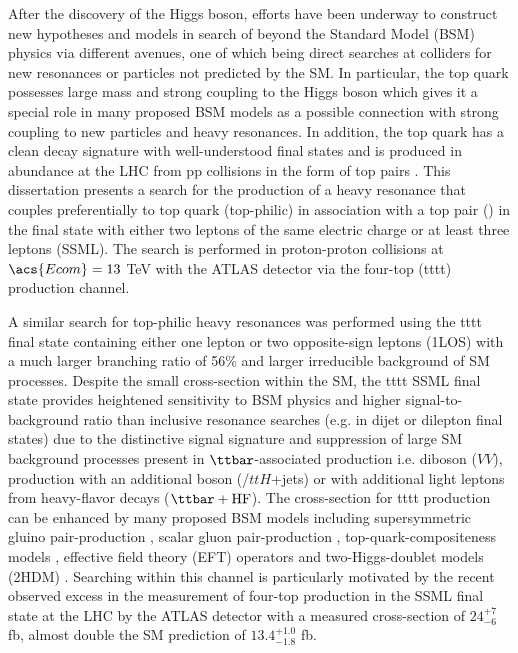 \documentclass[../thesis.tex]{subfiles}
\begin{document}
After the discovery of the Higgs boson, efforts have been underway to construct new hypotheses and models in search of beyond the Standard Model (\acs{BSM}) physics via different avenues, one of which being direct searches at colliders for new resonances or particles not predicted by the \acs{SM}. In particular, the top quark possesses large mass and strong coupling to the Higgs boson \citep{theory:top_coupling} which gives it a special role in many proposed \acs{BSM} models as a possible connection with strong coupling to new particles and heavy resonances. In addition, the top quark has a clean decay signature with well-understood final states and is produced in abundance at the \acs{LHC} from \acs{pp} collisions in the form of top pairs \ttbar \citep{TOPQ-2018-39,Degrande_2011}. This dissertation presents a search for the production of a heavy resonance that couples preferentially to top quark (top-philic) in association with a top pair (\ttbar) in the final state with either two leptons of the same electric charge or at least three leptons (\acs{SSML}). The search is performed in proton-proton collisions at $\acs{Ecom}=13$ TeV with the \acs{ATLAS} detector \citep{atlas} via the four-top (\acs{tttt}) production channel.

A similar search for top-philic heavy resonances was performed using the \acs{tttt} final state containing either one lepton or two opposite-sign leptons (\acs{1LOS}) \citep{theory:ttZp_1los} with a much larger branching ratio of 56\% and larger irreducible background of \acs{SM} processes. Despite the small cross-section within the \acs{SM}, the \acs{tttt} \acs{SSML} final state provides heightened sensitivity to \acs{BSM} physics and higher signal-to-background ratio than inclusive resonance searches (e.g. in dijet or dilepton final states) due to the distinctive signal signature and suppression of large \acs{SM} background processes present in $\ttbar$-associated production i.e. diboson ($VV$), \ttbar production with an additional boson (\ttV/$ttH$+jets) or with additional light leptons from heavy-flavor decays ($\ttbar+\text{HF}$). The cross-section for \acs{tttt} production can be enhanced by many proposed \acs{BSM} models including supersymmetric gluino pair-production \citep{Nilles:1983ge,Farrar:1978xj}, scalar gluon pair-production \citep{Plehn_2009,Calvet_2013}, top-quark-compositeness models \citep{Pomarol_2008,Kumar_2009}, effective field theory (\acs{EFT}) operators \citep{Banelli_2021,Aoude_2022,Zhang_2018,Degrande_2011,Darm__2021} and two-Higgs-doublet models (\acs{2HDM}) \citep{Craig:2015jba,Craig_2017,Branco:2011iw,PhysRevD.93.075038,higgscomp}. Searching within this channel is particularly motivated by the recent observed excess in the measurement of four-top production in the \acs{SSML} final state at the \acs{LHC} by the \acs{ATLAS} detector \citep{tttt_obs} with a measured cross-section of $24^{+7}_{-6}$ fb, almost double the \acs{SM} prediction of $13.4^{+1.0}_{-1.8}$ fb.
\end{document}
